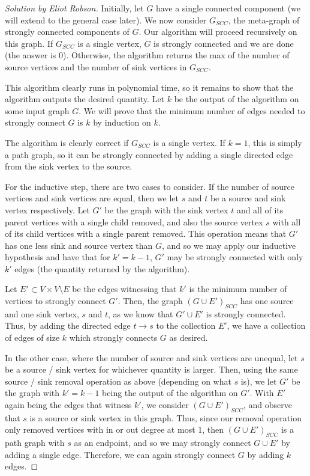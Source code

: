 \documentclass{article}
\newenvironment{solution}[1]{\begin{proof}[Solution by #1]}{\end{proof}}
\begin{document}
\begin{solution}{Eliot Robson}
    Initially, let \(G\) have a single connected component (we will extend to the general case later). We now consider \(G_{SCC}\), the meta-graph of strongly connected components of \(G\). Our algorithm will proceed recursively on this graph. If \(G_{SCC}\) is a single vertex, \(G\) is strongly connected and we are done (the answer is 0). Otherwise, the algorithm returns the max of the number of source vertices and the number of sink vertices in \(G_{SCC}\).
    
    This algorithm clearly runs in polynomial time, so it remains to show that the algorithm outputs the desired quantity. Let \(k\) be the output of the algorithm on some input graph \(G\). We will prove that the minimum number of edges needed to strongly connect \(G\) is \(k\) by induction on \(k\).
    
    The algorithm is clearly correct if \(G_{SCC}\) is a single vertex. If \(k = 1\), this is simply a path graph, so it can be strongly connected by adding a single directed edge from the sink vertex to the source.
    
    For the inductive step, there are two cases to consider. If the number of source vertices and sink vertices are equal, then we let \(s\) and \(t\) be a source and sink vertex respectively. Let \(G'\) be the graph with the sink vertex \(t\) and all of its parent vertices with a single child removed, and also the source vertex \(s\) with all of its child vertices with a single parent removed. This operation means that \(G'\) has one less sink and source vertex than \(G\), and so we may apply our inductive hypothesis and have that for \(k' = k-1\), \(G'\) may be strongly connected with only \(k'\) edges (the quantity returned by the algorithm).
    
    Let \(E' \subset V \times V \setminus E\) be the edges witnessing that \(k'\) is the minimum number of vertices to strongly connect \(G'\). Then, the graph \((G \cup E')_{SCC}\) has one source and one sink vertex, \(s\) and \(t\), as we know that \(G' \cup E'\) is strongly connected. Thus, by adding the directed edge \(t \rightarrow s\) to the collection \(E'\), we have a collection of edges of size \(k\) which strongly connects \(G\) as desired.
    
    In the other case, where the number of source and sink vertices are unequal, let \(s\) be a source / sink vertex for whichever quantity is larger. Then, using the same source / sink removal operation as above (depending on what \(s\) is), we let \(G'\) be the graph with \(k' = k-1\) being the output of the algorithm on \(G'\). With \(E'\) again being the edges that witness \(k'\), we consider \((G \cup E')_{SCC}\), and observe that \(s\) is a source or sink vertex in this graph. Thus, since our removal operation only removed vertices with in or out degree at most 1, then \((G \cup E')_{SCC}\) is a path graph with \(s\) as an endpoint, and so we may strongly connect \(G \cup E'\) by adding a single edge. Therefore, we can again strongly connect \(G\) by adding \(k\) edges.
    

\end{solution}
\end{document}
